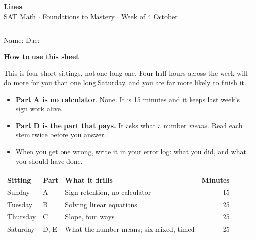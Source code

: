 \documentclass[11pt,a4paper]{article}
\newif\ifANSWERS
\begin{document}
\label{firstpage}

\begin{center}
{\LARGE\bfseries\color{navy}Lines}\\[4pt]
{\color{navy}SAT Math $\cdot$ Foundations to Mastery $\cdot$ Week of 4 October}
\ifANSWERS\\[4pt]{\color{keyred}\bfseries ANSWER KEY --- tutor copy}\fi
\end{center}
\vspace{2pt}
{\color{rule}\rule{\textwidth}{1pt}}
\vspace{6pt}

\ifANSWERS\else
Name: \underline{\hspace{6cm}} \hfill Due: \underline{\hspace{3.2cm}}
\vspace{6pt}
\fi

\begin{mdframed}[backgroundcolor=boxbg,linecolor=navy,linewidth=0.6pt,innertopmargin=6pt,innerbottommargin=8pt]
{\bfseries\color{navy}How to use this sheet}\par\vspace{2pt}
This is four short sittings, not one long one. Four half-hours across the week will
do more for you than one long Saturday, and you are far more likely to finish it.

\begin{itemize}[leftmargin=14pt,itemsep=1pt,topsep=3pt]
  \item \textbf{Part A is no calculator.} None. It is 15 minutes and it keeps last week's sign work alive.
  \item \textbf{Part D is the part that pays.} It asks what a number \emph{means}. Read each stem twice before you answer.
  \item When you get one wrong, write it in your error log: what you did, and what you should have done.
\end{itemize}
\end{mdframed}

\vspace{4pt}
\begin{center}
\begin{tabularx}{\textwidth}{@{}l l X r@{}}
\textbf{Sitting} & \textbf{Part} & \textbf{What it drills} & \textbf{Minutes}\\[2pt]
\hline\rule{0pt}{11pt}
Sunday   & A    & Sign retention, no calculator                     & 15\\
Tuesday  & B    & Solving linear equations                          & 25\\
Thursday & C    & Slope, four ways                                  & 25\\
Saturday & D, E & What the number means; six mixed, timed           & 25\\
\hline
\end{tabularx}
\end{center}
\end{document}
